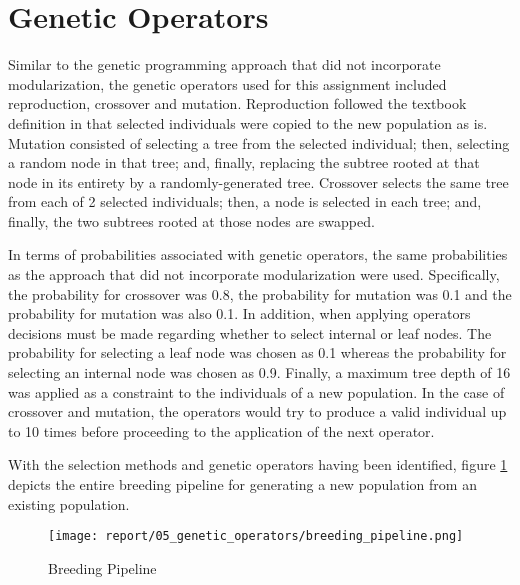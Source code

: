 \section{Genetic Operators}\label{sec:genetic_operators}
Similar to the genetic programming approach that did not incorporate modularization, the genetic operators used for this assignment included reproduction, crossover and mutation. Reproduction followed the textbook definition \cite{koza2005genetic} in that selected individuals were copied to the new population as is. Mutation consisted of selecting a tree from the selected individual; then, selecting a random node in that tree; and, finally, replacing the subtree rooted at that node in its entirety by a randomly-generated tree. Crossover selects the same tree from each of 2 selected individuals; then, a node is selected in each tree; and, finally, the two subtrees rooted at those nodes are swapped.

In terms of probabilities associated with genetic operators, the same probabilities as the approach that did not incorporate modularization were used. Specifically, the probability for crossover was 0.8, the probability for mutation was 0.1 and the probability for mutation was also 0.1. In addition, when applying operators decisions must be made regarding whether to select internal or leaf nodes. The probability for selecting a leaf node was chosen as 0.1 whereas the probability for selecting an internal node was chosen as 0.9. Finally, a maximum tree depth of 16 was applied as a constraint to the individuals of a new population. In the case of crossover and mutation, the operators would try to produce a valid individual up to 10 times before proceeding to the application of the next operator.

With the selection methods and genetic operators having been identified, figure \ref{fig:breeding_pipeline} depicts the entire breeding pipeline for generating a new population from an existing population.

\begin{figure}[H]
\centering
\texttt{[image: report/05\_genetic\_operators/breeding\_pipeline.png]}
\caption{Breeding Pipeline}
\label{fig:breeding_pipeline}
\end{figure}